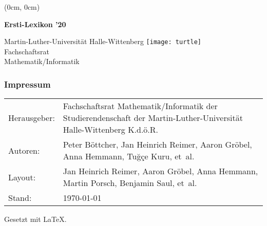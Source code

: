 \thispagestyle{empty}
\pagecolor{coverbackground}
\color{coverforeground}
{
    \setlength{\parindent}{0pt}
    \sffamily
    \begin{textblock*}{\textwidth}(0cm, 0cm)%
        \begin{sideways}
            \begin{minipage}{\textheight}
                \fontsize{1.5cm}{1.5cm}\selectfont%
                \bfseries
                \hspace{-0.1em}
                Ersti-Lexikon ’20
                \hfill
            \end{minipage}
        \end{sideways}%
    \end{textblock*}
    {
        \fontsize{0.45cm}{0.45cm}\selectfont
        Martin-Luther-Universität \hfill
        Halle-Wittenberg
    }
    \vfill
    \texttt{[image: turtle]} \\[0.5cm]
    {%
        \fontsize{0.675cm}{0.675cm}\selectfont
        Fachschaftsrat \\[0.5ex]
        Mathematik/Informatik
    }%
}%
\newpage
\restoregeometry
\nopagecolor
\color{black}

\thispagestyle{empty}
\subsubsection{Impressum}
\begin{tabu} to 
    Herausgeber: & Fachschaftsrat Mathematik/Informatik der
        Studierendenschaft der Martin-Luther-Universität Halle-Wittenberg K.d.ö.R. \\
    Autoren: &
        Peter Böttcher,
        Jan Heinrich Reimer,
        Aaron Gröbel,
        Anna Hemmann,
        Tuğçe Kuru,
        et~al. \\
    Layout: & 
        Jan Heinrich Reimer,
        Aaron Gröbel,
        Anna Hemmann,
        Martin Porsch,
        Benjamin Saul, 
        et~al. \\
    Stand: & \today
\end{tabu}
{\scriptsize Gesetzt mit \LaTeX.}
\newpage

